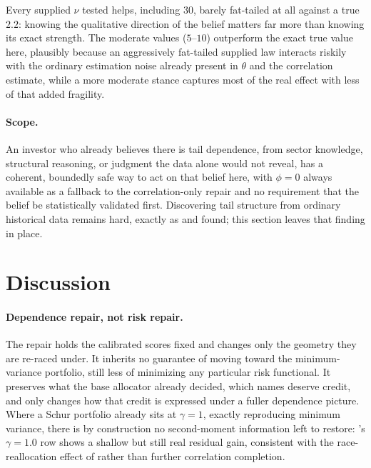 \documentclass[11pt]{article}
\begin{document}
Every supplied $\nu$ tested helps, including $30$, barely fat-tailed at
all against a true $2.2$: knowing the qualitative direction of the belief
matters far more than knowing its exact strength. The moderate values
($5$--$10$) outperform the exact true value here, plausibly because an
aggressively fat-tailed supplied law interacts riskily with the ordinary
estimation noise already present in $\theta$ and the correlation estimate,
while a more moderate stance captures most of the real effect with less of
that added fragility.

\paragraph{Scope.} An investor who already believes there is tail
dependence, from sector knowledge, structural reasoning, or judgment the
data alone would not reveal, has a coherent, boundedly safe way to act on
that belief here, with $\phi=0$ always available as a fallback to the
correlation-only repair and no requirement that the belief be
statistically validated first. Discovering tail structure from ordinary
historical data remains hard, exactly as  and
 found; this section leaves that finding in place.

\section{Discussion}
\label{sec:discussion}

\paragraph{Dependence repair, not risk repair.} The repair holds the
calibrated scores fixed and changes only the geometry they are re-raced
under. It inherits no guarantee of moving toward the minimum-variance
portfolio, still less of minimizing any particular risk functional. It
preserves what the base allocator already decided, which names deserve
credit, and only changes how that credit is expressed under a fuller
dependence picture. Where a Schur portfolio already sits at $\gamma=1$,
exactly reproducing minimum variance, there is by construction no
second-moment information left to restore: 's $\gamma=1.0$
row shows a shallow but still real residual gain, consistent with the
race-reallocation effect of  rather than further
correlation completion.
\end{document}
